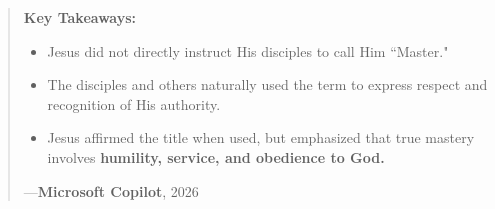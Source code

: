 \documentclass[a4paper]{article}
\begin{document}

\noindent
\begin{minipage}{1\textwidth}
\vspace{1em}
\begin{quotation}
{\ttfamily



\vspace{2em}
\textbf{Key Takeaways:}
\begin{itemize}
\item Jesus did not directly instruct His disciples to call Him ``Master."  
\item The disciples and others naturally used the term to express respect and recognition of His authority.  
\item Jesus affirmed the title when used, but emphasized that true mastery involves \textbf{humility, service, and obedience to God.}
\end{itemize}

}
\hspace*{\fill} ---\textbf{Microsoft Copilot}, 2026\cite{copilot_assistant}
\end{quotation}
\vspace{1em}
\end{minipage}
\end{document}
